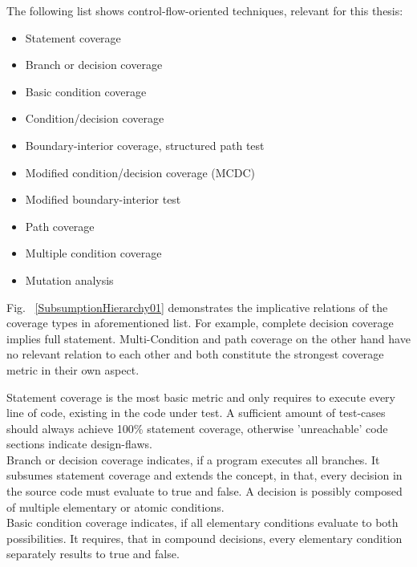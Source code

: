	The following list shows control-flow-oriented techniques, relevant for this thesis:
	\begin{itemize} \setlength\itemsep{1px}
		\item Statement coverage
		\item Branch or decision coverage
		\item Basic condition coverage
		\item Condition/decision coverage
	\item Boundary-interior coverage, structured path test
		\item Modified condition/decision coverage (MCDC)
		\item Modified boundary-interior test
		\item Path coverage
		\item Multiple condition coverage
		\item Mutation analysis \\
	\end{itemize} 

	Fig. ~\ref{SubsumptionHierarchy01} demonstrates the implicative relations of the coverage types in aforementioned list. For example, complete decision coverage implies	full statement. Multi-Condition and path coverage on the other hand have no relevant relation to each other and both constitute the strongest coverage metric in their own aspect. \\
	

	Statement coverage is the most basic metric and only requires to execute every line of code, existing in the code under test. A sufficient amount of test-cases should always achieve 100\% statement coverage, otherwise 'unreachable' code sections indicate design-flaws. \\
	
	Branch or decision coverage indicates, if a program executes all branches. It subsumes statement coverage and extends the concept, in that, every decision in the source code must evaluate to true and false. A decision is possibly composed of multiple elementary or atomic conditions. \\
	
	Basic condition coverage indicates, if all elementary conditions evaluate to both possibilities. It requires, that in compound decisions, every elementary condition separately results to true and false.  \\

